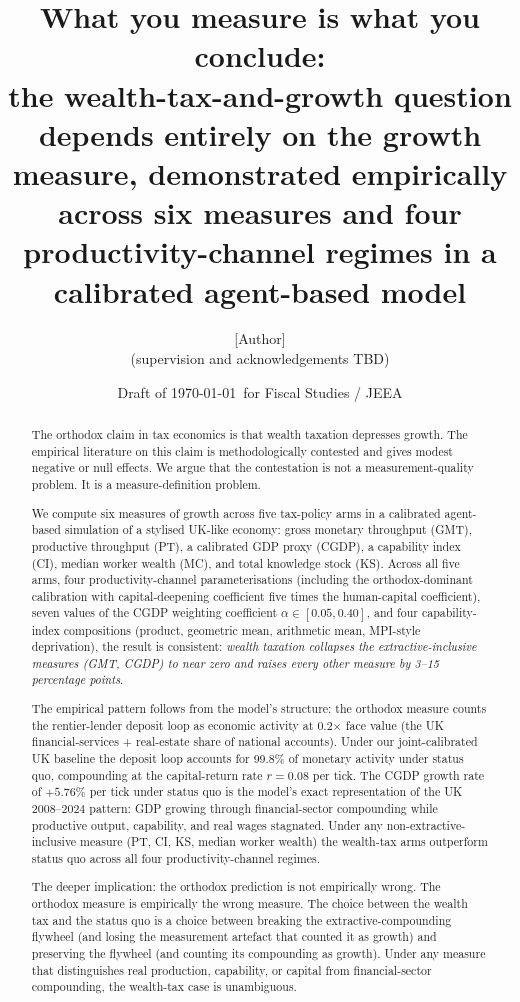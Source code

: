 \documentclass[11pt]{article}
\title{What you measure is what you conclude:\\
\large the wealth-tax-and-growth question depends entirely on the
growth measure, demonstrated empirically across six measures and
four productivity-channel regimes in a calibrated agent-based model}
\author{[Author]\\
\small (supervision and acknowledgements TBD)}
\date{Draft of \today\ for Fiscal Studies / JEEA}
\begin{document}
\maketitle

\begin{abstract}
The orthodox claim in tax economics is that wealth taxation depresses
growth.  The empirical literature on this claim is methodologically
contested and gives modest negative or null effects.  We argue that
the contestation is not a measurement-quality problem.  It is a
measure-definition problem.

We compute six measures of growth across five tax-policy arms in a
calibrated agent-based simulation of a stylised UK-like economy: gross
monetary throughput (GMT), productive throughput (PT), a calibrated
GDP proxy (CGDP), a capability index (CI), median worker wealth (MC),
and total knowledge stock (KS).  Across all five arms, four productivity-channel parameterisations
(including the orthodox-dominant calibration with capital-deepening
coefficient five times the human-capital coefficient), seven values
of the CGDP weighting coefficient $\alpha \in [0.05, 0.40]$, and four
capability-index compositions (product, geometric mean, arithmetic
mean, MPI-style deprivation), the result is consistent: \emph{wealth
taxation collapses the extractive-inclusive measures (GMT, CGDP) to
near zero and raises every other measure by 3--15 percentage points}.

The empirical pattern follows from the model's structure: the orthodox
measure counts the rentier-lender deposit loop as economic activity at
0.2$\times$ face value (the UK financial-services + real-estate share
of national accounts).  Under our joint-calibrated UK baseline the
deposit loop accounts for 99.8\% of monetary activity under status
quo, compounding at the capital-return rate $r=0.08$ per tick.  The
CGDP growth rate of $+5.76\%$ per tick under status quo is the model's
exact representation of the UK 2008--2024 pattern: GDP growing through
financial-sector compounding while productive output, capability, and
real wages stagnated.  Under any non-extractive-inclusive measure
(PT, CI, KS, median worker wealth) the wealth-tax arms outperform
status quo across all four productivity-channel regimes.

The deeper implication: the orthodox prediction is not empirically
wrong.  The orthodox measure is empirically the wrong measure.  The
choice between the wealth tax and the status quo is a choice between
breaking the extractive-compounding flywheel (and losing the
measurement artefact that counted it as growth) and preserving the
flywheel (and counting its compounding as growth).  Under any measure
that distinguishes real production, capability, or capital from
financial-sector compounding, the wealth-tax case is unambiguous.


\end{abstract}
\end{document}
